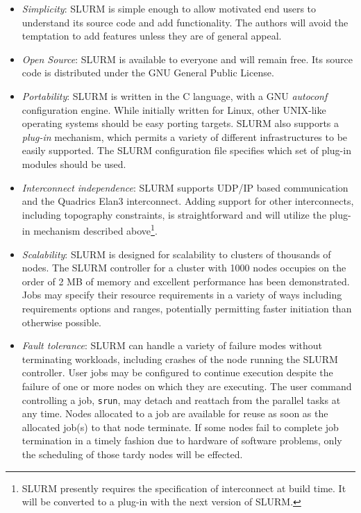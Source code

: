 \documentclass{article}
\begin{document}
\begin{itemize}
\item {\em Simplicity}: SLURM is simple enough to allow motivated end users
to understand its source code and add functionality.  The authors will 
avoid the temptation to add features unless they are of general appeal. 

\item {\em Open Source}: SLURM is available to everyone and will remain free. 
Its source code is distributed under the GNU General Public 
License\cite{GPL2002}.

\item {\em Portability}: SLURM is written in the C language, with a GNU 
{\em autoconf} configuration engine.  
While initially written for Linux, other UNIX-like operating systems 
should be easy porting targets.
SLURM also supports a {\em plug-in} mechanism, which permits a variety 
of different infrastructures to be easily supported. 
The SLURM configuration file specifies which set of plug-in modules 
should be used. 

\item {\em Interconnect independence}: SLURM supports UDP/IP based
communication and the Quadrics Elan3 interconnect.  Adding support for 
other interconnects, including topography constraints, is straightforward 
and will utilize the plug-in mechanism described above\footnote{SLURM 
presently requires the specification of interconnect at build time. 
It will be converted to a plug-in with the next version of SLURM.}.

\item {\em Scalability}: SLURM is designed for scalability to clusters of
thousands of nodes. The SLURM controller for a cluster with 1000 nodes 
occupies on the order of 2 MB of memory and excellent performance has 
been demonstrated. 
Jobs may specify their resource requirements in a variety of ways 
including requirements options and ranges, potentially permitting 
faster initiation than otherwise possible.

\item {\em Fault tolerance}: SLURM can handle a variety of failure modes
without terminating workloads, including crashes of the node running 
the SLURM controller. 
User jobs may be configured to continue execution despite the failure 
of one or more nodes on which they are executing. 
The user command controlling a job, {\tt srun}, may detach and reattach 
from the parallel tasks at any time. 
Nodes allocated to a job are available for reuse as soon as the allocated 
job(s) to that node terminate. If some nodes fail to complete job termination 
in a timely fashion due to hardware of software problems, only the 
scheduling of those tardy nodes will be effected.


\end{itemize}
\end{document}
